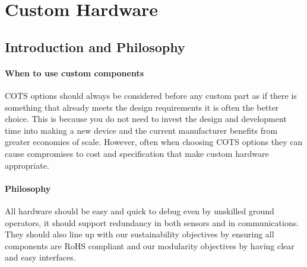 \newpage
{}
\section{Custom Hardware} \label{section:Custom Hardware}

\subsection{Introduction and Philosophy}
\paragraph{When to use custom components}
\gls{COTS} options should always be considered before any custom part as if there is something that already meets the design requirements it is often the better choice. This is because you do not need to invest the design and development time into making a new device and the current manufacturer benefits from greater economies of scale. However, often when choosing \gls{COTS} options they can cause compromises to cost and specification that make custom hardware appropriate.
\paragraph{Philosophy}
All hardware should be easy and quick to debug even by unskilled ground operators, it should support redundancy in both sensors and in communications. They should also line up with our sustainability objectives by ensuring all components are \gls{RoHS} compliant and our modularity objectives by having clear and easy interfaces.



